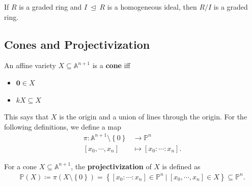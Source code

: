 \begin{proposition}

If \(R\) is a graded ring and \(I{~\trianglelefteq~}R\) is a homogeneous
ideal, then \(R/I\) is a graded ring.

\end{proposition}

\hypertarget{cones-and-projectivization}{%
\subsection{Cones and
Projectivization}\label{cones-and-projectivization}}

\begin{definition}[Cones]

An affine variety \(X \subseteq {\mathbb{A}}^{n+1}\) is a \textbf{cone}
iff

\begin{itemize}
\tightlist
\item
  \(\mathbf{0} \in X\)
\item
  \(kX \subseteq X\)
\end{itemize}

\end{definition}

\begin{remark}

This says that \(X\) is the origin and a union of lines through the
origin. For the following definitions, we define a map
\begin{align*}  
\pi: {\mathbb{A}}^{n+1}\setminus\left\{{0}\right\}&\to {\mathbb{P}}^n \\
{\left[ {x_0, \cdots, x_n} \right]} &\mapsto {\left[ {x_0 : \cdots :x_n} \right]}
.\end{align*}

\end{remark}

\begin{definition}

For a cone \(X \subseteq {\mathbb{A}}^{n+1}\), the
\textbf{projectivization} of \(X\) is defined as
\begin{align*}  
{\mathbb{P}}(X) \coloneqq\pi(X\setminus\left\{{0}\right\}) = \left\{{ {\left[ {x_0: \cdots : x_n } \right]} \in {\mathbb{P}}^n {~\mathrel{\Big|}~}{\left[ {x_0, \cdots, x_n} \right]} \in X }\right\} \subseteq {\mathbb{P}}^n
.\end{align*}

\end{definition}

